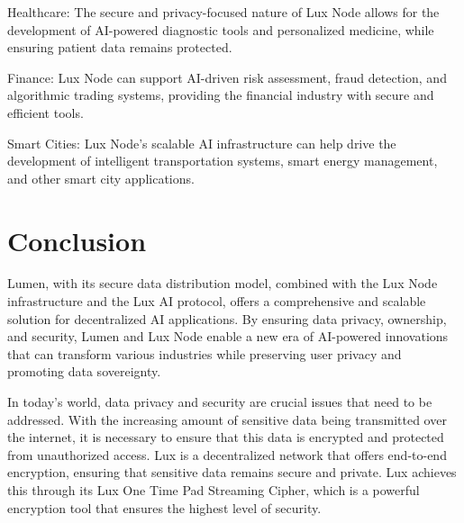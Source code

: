 \documentclass[11pt]{article}
\begin{document}
Healthcare: The secure and privacy-focused nature of Lux Node allows for the development of AI-powered diagnostic tools and personalized medicine, while ensuring patient data remains protected.


Finance: Lux Node can support AI-driven risk assessment, fraud detection, and algorithmic trading systems, providing the financial industry with secure and efficient tools.


Smart Cities: Lux Node's scalable AI infrastructure can help drive the development of intelligent transportation systems, smart energy management, and other smart city applications.


\section{Conclusion}

Lumen, with its secure data distribution model, combined with the Lux Node infrastructure and the Lux AI protocol, offers a comprehensive and scalable solution for decentralized AI applications. By ensuring data privacy, ownership, and security, Lumen and Lux Node enable a new era of AI-powered innovations that can transform various industries while preserving user privacy and promoting data sovereignty.


In today's world, data privacy and security are crucial issues that need to be addressed. With the increasing amount of sensitive data being transmitted over the internet, it is necessary to ensure that this data is encrypted and protected from unauthorized access. Lux is a decentralized network that offers end-to-end encryption, ensuring that sensitive data remains secure and private. Lux achieves this through its Lux One Time Pad Streaming Cipher, which is a powerful encryption tool that ensures the highest level of security.
\end{document}
